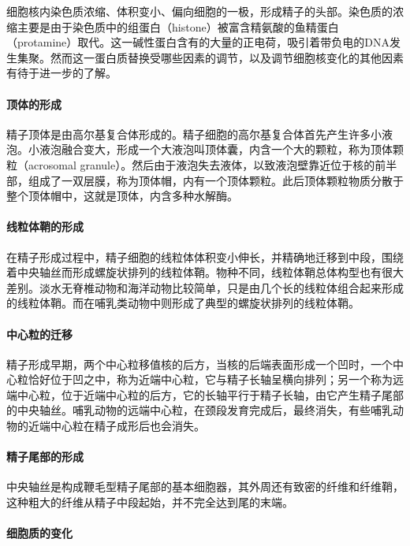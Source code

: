 细胞核内染色质浓缩、体积变小、偏向细胞的一极，形成精子的头部。染色质的浓缩主要是由于染色质中的组蛋白（histone）被富含精氨酸的鱼精蛋白（protamine）取代。这一碱性蛋白含有的大量的正电荷，吸引着带负电的DNA发生集聚。然而这一蛋白质替换受哪些因素的调节，以及调节细胞核变化的其他因素有待于进一步的了解。

\paragraph{顶体的形成}

精子顶体是由高尔基复合体形成的。精子细胞的高尔基复合体首先产生许多小液泡。小液泡融合变大，形成一个大液泡叫顶体囊，内含一个大的颗粒，称为顶体颗粒（acrosomal granule）。然后由于液泡失去液体，以致液泡壁靠近位于核的前半部，组成了一双层膜，称为顶体帽，内有一个顶体颗粒。此后顶体颗粒物质分散于整个顶体帽中，这就是顶体，内含多种水解酶。

\paragraph{线粒体鞘的形成}

在精子形成过程中，精子细胞的线粒体体积变小伸长，并精确地迁移到中段，围绕着中央轴丝而形成螺旋状排列的线粒体鞘。物种不同，线粒体鞘总体构型也有很大差别。淡水无脊椎动物和海洋动物比较简单，只是由几个长的线粒体组合起来形成的线粒体鞘。而在哺乳类动物中则形成了典型的螺旋状排列的线粒体鞘。

\paragraph{中心粒的迁移}

精子形成早期，两个中心粒移值核的后方，当核的后端表面形成一个凹时，一个中心粒恰好位于凹之中，称为近端中心粒，它与精子长轴呈横向排列；另一个称为远端中心粒，位于近端中心粒的后方，它的长轴平行于精子长轴，由它产生精子尾部的中央轴丝。哺乳动物的远端中心粒，在颈段发育完成后，最终消失，有些哺乳动物的近端中心粒在精子成形后也会消失。

\paragraph{精子尾部的形成}

中央轴丝是构成鞭毛型精子尾部的基本细胞器，其外周还有致密的纤维和纤维鞘，这种粗大的纤维从精子中段起始，并不完全达到尾的末端。

\paragraph{细胞质的变化}

